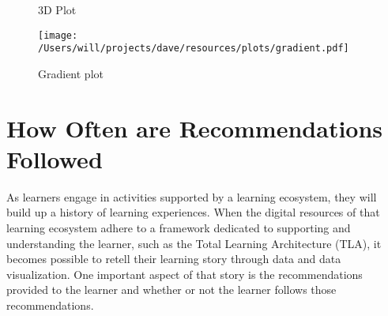 \documentclass{article}
\begin{document}
\begin{figure*}[h]
  \centering
  \begin{floatrow}[3]
    {}
    {}
  \end{floatrow}
\end{figure*}

\begin{figure}[h]
  \centering
  \caption{3D Plot}
\end{figure}

\begin{figure}[h]
  \centering
  \texttt{[image: /Users/will/projects/dave/resources/plots/gradient.pdf]}
  \caption{Gradient plot}
\end{figure}


\section{How Often are Recommendations Followed}
As learners engage in activities supported by a learning ecosystem, they will build
up a history of learning experiences. When the digital resources of that learning ecosystem
adhere to a framework dedicated to supporting and understanding the
learner, such as the Total Learning Architecture (TLA), it becomes
possible to retell their learning story through data and data
visualization. One important aspect of that story is the
recommendations provided to the learner and whether or not the learner
follows those recommendations.
\end{document}
